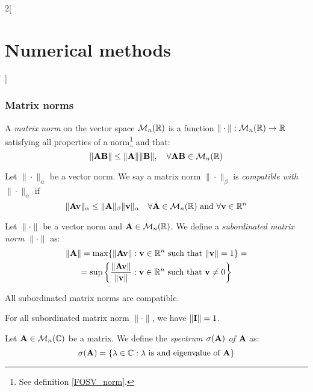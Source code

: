\documentclass[../../../main.tex]{subfiles}
\begin{document}
\begin{multicols}{2}[\section{Numerical methods}]
    \subsubsection*{Matrix norms}
    \begin{definition}
        A \textit{matrix norm} on the vector space $\mathcal{M}_n(\mathbb{R})$ is a function $\|\cdot\|:\mathcal{M}_n(\mathbb{R})\rightarrow\mathbb{R}$ satisfying all properties of a norm\footnote{See definition \ref{FOSV_norm}.} and that: $$\|\vb{A}\vb{B}\|\leq\|\vb{A}\|\|\vb{B}\|,\quad\forall \vb{A}\vb{B}\in\mathcal{M}_n(\mathbb{R})$$
    \end{definition}
    \begin{definition}
        Let $\|\cdot\|_\alpha$ be a vector norm. We say a matrix norm $\|\cdot\|_\beta$ is \textit{compatible with $\|\cdot\|_\alpha$} if $$\|\vb{A}\vb{v}\|_\alpha\leq\|\vb{A}\|_\beta\|\vb{v}\|_\alpha\quad\forall\vb{A}\in\mathcal{M}_n(\mathbb{R})\text{ and }\forall\vb{v}\in\mathbb{R}^n$$
    \end{definition}
    \begin{definition}
        Let $\|\cdot\|$ be a vector norm and $\vb{A}\in\mathcal{M}_n(\mathbb{R})$. We define a \textit{subordinated matrix norm} $\|\cdot\|$ as:
        \begin{multline*}
            \|\vb{A}\|=\max\{\|\vb{A}\vb{v}\|:\vb{v}\in\mathbb{R}^n\text{ such that }\|\vb{v}\|=1\}=\\=\sup\left\{\frac{\|\vb{A}\vb{v}\|}{\|\vb{v}\|}:\vb{v}\in\mathbb{R}^n\text{ such that }\vb{v}\ne 0\right\}
        \end{multline*}
    \end{definition}
    \begin{lemma}
        All subordinated matrix norms are compatible.
    \end{lemma}
    \begin{lemma}
        For all subordinated matrix norm $\|\cdot\|$, we have $\|\vb{I}\|=1$.
    \end{lemma}
    \begin{definition}
        Let $\vb{A}\in\mathcal{M}_n(\mathbb{C})$ be a matrix. We define the \textit{spectrum $\sigma(\vb{A})$ of $\vb{A}$} as: $$\sigma(\vb{A})=\{\lambda\in\mathbb{C}:\lambda\text{ is and eigenvalue of }\vb{A}\}$$
    \end{definition}
    \begin{definition}

\end{definition}
\end{multicols}
\end{document}
